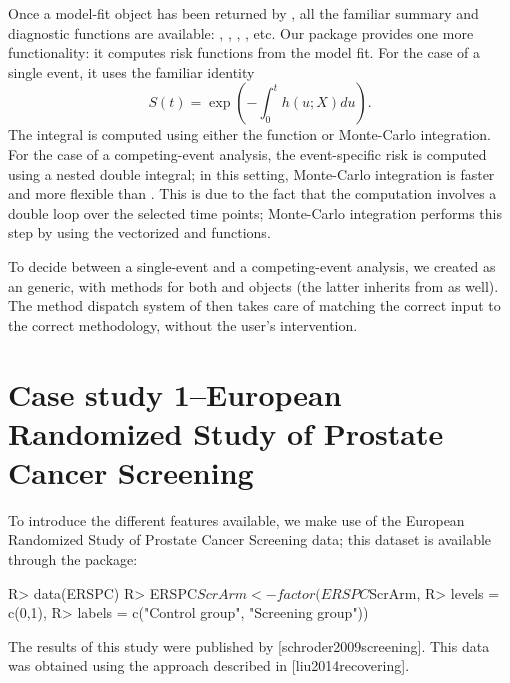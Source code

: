 \documentclass[
]{jss}
\begin{document}
Once a model-fit object has been returned by , all
the familiar summary and diagnostic functions are available:
, , , , etc. Our
package provides one more functionality: it computes risk functions from
the model fit. For the case of a single event, it uses the familiar
identity \[S(t) = \exp\left(-\int_0^t h(u;X) du\right).\] The integral
is computed using either the  function or
Monte-Carlo integration. For the case of a competing-event analysis, the
event-specific risk is computed using a nested double integral; in this
setting, Monte-Carlo integration is faster and more flexible than
. This is due to the fact that the computation
involves a double loop over the selected time points; Monte-Carlo
integration performs this step by using the vectorized 
and  functions.

To decide between a single-event and a competing-event analysis, we
created  as an  generic, with methods for
both  and  objects (the latter inherits from
 as well). The method dispatch system of  then
takes care of matching the correct input to the correct methodology,
without the user's intervention.

\hypertarget{case-study-1european-randomized-study-of-prostate-cancer-screening}{%
\section{Case study 1--European Randomized Study of Prostate Cancer
Screening}\label{case-study-1european-randomized-study-of-prostate-cancer-screening}}

To introduce the different features available, we make use of the
European Randomized Study of Prostate Cancer Screening data; this
dataset is available through the  package:

\begin{CodeChunk}

\begin{CodeInput}
R> data(ERSPC)
R> ERSPC$ScrArm <- factor(ERSPC$ScrArm, 
R>                        levels = c(0,1), 
R>                        labels = c("Control group", "Screening group"))
\end{CodeInput}
\end{CodeChunk}

The results of this study were published by {[}schroder2009screening{]}.
This data was obtained using the approach described in
{[}liu2014recovering{]}.
\end{document}
